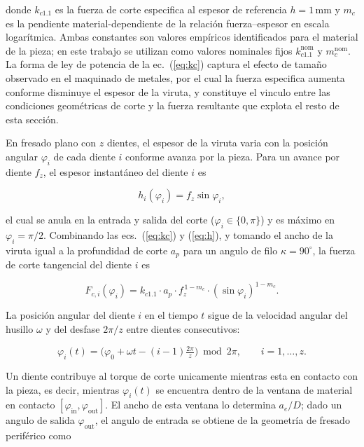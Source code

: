 \documentclass[12pt, letterpaper]{article}
\begin{document}
donde $k_{c1.1}$ es la fuerza de corte especifica al espesor de referencia $h = 1\,\text{mm}$ y $m_c$ es la pendiente material-dependiente de la relación fuerza--espesor en escala logarítmica. Ambas constantes son valores empíricos identificados para el material de la pieza; en este trabajo se utilizan como valores nominales fijos $k_{c1.1}^{\text{nom}}$ y $m_c^{\text{nom}}$. La forma de ley de potencia de la ec.~(\ref{eq:kc}) captura el efecto de tamaño observado en el maquinado de metales, por el cual la fuerza especifica aumenta conforme disminuye el espesor de la viruta, y constituye el vinculo entre las condiciones geométricas de corte y la fuerza resultante que explota el resto de esta sección.

En fresado plano con $z$ dientes, el espesor de la viruta varia con la posición angular $\varphi_i$ de cada diente $i$ conforme avanza por la pieza. Para un avance por diente $f_z$, el espesor instantáneo del diente $i$ es

\begin{equation}
  h_i(\varphi_i) = f_z \sin\varphi_i,
  \label{eq:h}
\end{equation}

el cual se anula en la entrada y salida del corte ($\varphi_i \in \{0,\pi\}$) y es máximo en $\varphi_i = \pi/2$. Combinando las ecs.~(\ref{eq:kc}) y (\ref{eq:h}), y tomando el ancho de la viruta igual a la profundidad de corte $a_p$ para un angulo de filo $\kappa = 90^{\circ}$, la fuerza de corte tangencial del diente $i$ es

\begin{equation}
  F_{c,i}(\varphi_i) = k_{c1.1} \cdot a_p \cdot f_z^{\,1-m_c} \cdot (\sin\varphi_i)^{1-m_c}.
  \label{eq:Fc}
\end{equation}

La posición angular del diente $i$ en el tiempo $t$ sigue de la velocidad angular del husillo $\omega$ y del desfase $2\pi/z$ entre dientes consecutivos:

\begin{equation}
  \varphi_i(t) = \bigl(\varphi_0 + \omega t - (i-1)\tfrac{2\pi}{z}\bigr) \bmod 2\pi, \qquad i = 1,\dots,z.
  \label{eq:phi}
\end{equation}

Un diente contribuye al torque de corte unicamente mientras esta en contacto con la pieza, es decir, mientras $\varphi_i(t)$ se encuentra dentro de la ventana de material en contacto $[\varphi_{\text{in}}, \varphi_{\text{out}}]$. El ancho de esta ventana lo determina $a_e/D$; dado un angulo de salida $\varphi_{\text{out}}$, el angulo de entrada se obtiene de la geometría de fresado periférico como
\end{document}
